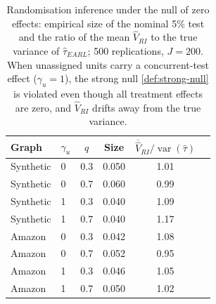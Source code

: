\documentclass[sigconf,nonacm]{acmart}
\DeclareMathOperator{\var}{var}
\begin{document}
\begin{table}
\caption{Randomisation inference under the null of zero effects: empirical size of the nominal 5\% test and the ratio of the mean $\hat V_{RI}$ to the true variance of $\hat\tau_{EARL}$; 500 replications, $J=200$. When unassigned units carry a concurrent-test effect ($\gamma_u=1$), the strong null \eqref{def:strong-null} is violated even though all treatment effects are zero, and $\hat V_{RI}$ drifts away from the true variance.}
\label{tab:ri}
\begin{tabular}{llcccc}
\toprule
Graph & $\gamma_u$ & $q$ & Size & $\overline{\hat V}_{RI}/\var(\hat\tau)$\\
\midrule
Synthetic & 0 & 0.3 & 0.050 & 1.01\\
Synthetic & 0 & 0.7 & 0.060 & 0.99\\
Synthetic & 1 & 0.3 & 0.040 & 1.09\\
Synthetic & 1 & 0.7 & 0.040 & 1.17\\
Amazon & 0 & 0.3 & 0.042 & 1.08\\
Amazon & 0 & 0.7 & 0.052 & 0.95\\
Amazon & 1 & 0.3 & 0.046 & 1.05\\
Amazon & 1 & 0.7 & 0.050 & 1.02\\
\bottomrule
\end{tabular}
\end{table}




\end{document}
